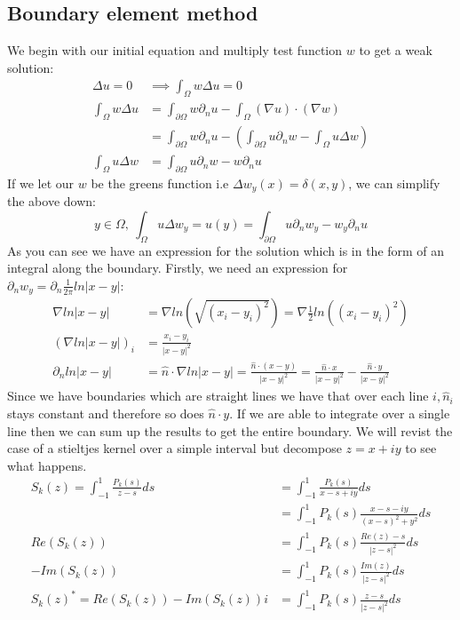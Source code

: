 \documentclass{article}
\begin{document}
\subsection{Boundary element method}
We begin with our initial equation and multiply test function $w$ to get a weak solution:
\begin{align}
    \Delta u=0&\implies \int_\Omega w\Delta u=0\\
    \int_\Omega w\Delta u&=\int_{\partial\Omega}w\partial_nu-\int_\Omega(\nabla u)\cdot(\nabla w)\\
    &=\int_{\partial\Omega}w\partial_nu-(\int_{\partial\Omega}u\partial_nw-\int_\Omega u\Delta w)\\
    \int_\Omega u\Delta w&=\int_{\partial\Omega}u\partial_nw-w\partial_nu
\end{align}
If we let our $w$ be the greens function i.e $\Delta w_y(x) = \delta(x,y)$, we can simplify the above down:
$$y\in\Omega,\:\int_\Omega u\Delta w_y=u(y)=\int_{\partial\Omega}u\partial_nw_y-w_y\partial_nu$$
As you can see we have an expression for the solution which is in the form of an integral along the boundary.
Firstly, we need an expression for $\partial_nw_y = \partial_n\frac{1}{2\pi}ln|x-y|$:
\begin{align}
    \nabla ln|x-y|&=\nabla ln(\sqrt{(x_i-y_i)^2})=\nabla\frac{1}{2}ln((x_i-y_i)^2)\\
    (\nabla ln|x-y|)_i &=\frac{x_i-y_i}{|x-y|^2}\\
    \partial_n ln|x-y| &= \hat n\cdot\nabla ln|x-y| = \frac{\hat n\cdot(x-y)}{|x-y|^2} = \frac{\hat n\cdot x}{|x-y|^2}-\frac{\hat n\cdot y}{|x-y|^2}
\end{align}
Since we have boundaries which are straight lines we have that over each line $i,\hat n_i$ stays constant and therefore so does $\hat n\cdot y$.
If we are able to integrate over a single line then we can sum up the results to get the entire boundary.
We will revist the case of a stieltjes kernel over a simple interval but decompose $z=x+iy$ to see what happens.
\begin{align}
    S_k(z)=\int_{-1}^1\frac{P_k(s)}{z-s}ds&=\int_{-1}^1\frac{P_k(s)}{x-s+iy}ds\\
    &=\int_{-1}^1P_k(s)\frac{x-s-iy}{(x-s)^2+y^2}ds\\
    Re(S_k(z))&=\int_{-1}^1P_k(s)\frac{Re(z)-s}{|z-s|^2}ds\\
    -Im(S_k(z))&=\int_{-1}^1P_k(s)\frac{Im(z)}{|z-s|^2}ds\\
    S_k(z)^*=Re(S_k(z))-Im(S_k(z))i&=\int_{-1}^1P_k(s)\frac{z-s}{|z-s|^2}ds
\end{align}
\end{document}
